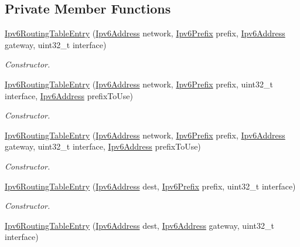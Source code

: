 \subsection*{Private Member Functions}
\begin{DoxyCompactItemize}
\item 
\hyperlink{classns3_1_1Ipv6RoutingTableEntry_a21d8401fecedc606a93e0c8536488ff0}{Ipv6\+Routing\+Table\+Entry} (\hyperlink{classns3_1_1Ipv6Address}{Ipv6\+Address} network, \hyperlink{classns3_1_1Ipv6Prefix}{Ipv6\+Prefix} prefix, \hyperlink{classns3_1_1Ipv6Address}{Ipv6\+Address} gateway, uint32\+\_\+t interface)
\begin{DoxyCompactList}\small\item\em Constructor. \end{DoxyCompactList}\item 
\hyperlink{classns3_1_1Ipv6RoutingTableEntry_ae14c29d991110a5b8d306162d0ff5d8c}{Ipv6\+Routing\+Table\+Entry} (\hyperlink{classns3_1_1Ipv6Address}{Ipv6\+Address} network, \hyperlink{classns3_1_1Ipv6Prefix}{Ipv6\+Prefix} prefix, uint32\+\_\+t interface, \hyperlink{classns3_1_1Ipv6Address}{Ipv6\+Address} prefix\+To\+Use)
\begin{DoxyCompactList}\small\item\em Constructor. \end{DoxyCompactList}\item 
\hyperlink{classns3_1_1Ipv6RoutingTableEntry_a21e0e2cd82af0385f7a0b1ac37ff86af}{Ipv6\+Routing\+Table\+Entry} (\hyperlink{classns3_1_1Ipv6Address}{Ipv6\+Address} network, \hyperlink{classns3_1_1Ipv6Prefix}{Ipv6\+Prefix} prefix, \hyperlink{classns3_1_1Ipv6Address}{Ipv6\+Address} gateway, uint32\+\_\+t interface, \hyperlink{classns3_1_1Ipv6Address}{Ipv6\+Address} prefix\+To\+Use)
\begin{DoxyCompactList}\small\item\em Constructor. \end{DoxyCompactList}\item 
\hyperlink{classns3_1_1Ipv6RoutingTableEntry_a142d343e89398572f460caa84963a176}{Ipv6\+Routing\+Table\+Entry} (\hyperlink{classns3_1_1Ipv6Address}{Ipv6\+Address} dest, \hyperlink{classns3_1_1Ipv6Prefix}{Ipv6\+Prefix} prefix, uint32\+\_\+t interface)
\begin{DoxyCompactList}\small\item\em Constructor. \end{DoxyCompactList}\item 
\hyperlink{classns3_1_1Ipv6RoutingTableEntry_aab957fcc3e31047f5f130eb9fe016cd0}{Ipv6\+Routing\+Table\+Entry} (\hyperlink{classns3_1_1Ipv6Address}{Ipv6\+Address} dest, \hyperlink{classns3_1_1Ipv6Address}{Ipv6\+Address} gateway, uint32\+\_\+t interface)

\end{DoxyCompactItemize}
